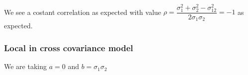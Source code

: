 \documentclass[11pt]{article}
\begin{document}
    \begin{center}
    \end{center}
    { \hspace*{\fill} \\}
    
    We see a costant correlation as expected with value
\(\rho=\dfrac{\sigma_1^2 + \sigma_2^2 - \sigma_{12}^2}{2 \sigma_1 \sigma_2} = -1\)
as expected.

    \subsubsection{Local in cross covariance
model}\label{local-in-cross-covariance-model}

We are taking \(a = 0\) and \(b = \sigma_1 \sigma_2\)
\end{document}
